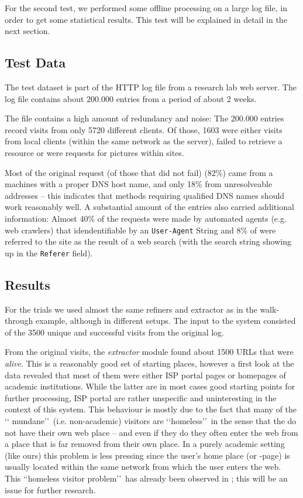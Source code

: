 \documentclass[a4paper,twoside]{danarticle}
\theoremstyle{remark}
\begin{document}
    For the second test, we performed some offline processing on a large log 
    file, in order to get some statistical results. This test will be explained 
    in detail in the next section.
    \subsection{Test Data}
      The test dataset is part of the HTTP log file from a research lab
      web server. The log file contains about 200.000 entries from a period of
      about 2 weeks.
      
      The file contains a high amount of redundancy and noise: The 200.000 
      entries record visits from only 5720 different clients. Of those, 1603 
      were either visits from local clients (within the same network as the 
      server), failed to retrieve a resource or were requests for pictures 
      within sites.
      
      Most of the original request (of those that did not fail) (82\%) came from a 
      machines with a proper
      DNS host name, and only 18\% from unresolveable addresses -- this indicates
      that methods requiring qualified DNS names should work reasonably well. A
      substantial amount of the entries also carried additional information:
      Almost 40\% of the requests were made by automated agents (e.g. web
      crawlers) that idendentifiable by an \verb$User-Agent$ String and 8\% of
      were referred to the site as the result of a web search (with the search
      string showing up in the \verb$Referer$ field). 
    \subsection{Results}
      For the trials we used almost the same refiners and extractor as in the
      walk-through example, although in different setups. The input to the 
      system consisted of the 3500 unique and successful visits from the original 
      log. 
      
      From the original visits, 
      the \textit{extractor} module found about 1500 URLs that
      were \textit{alive}. This is a reasonably good set of starting places,
      however a first look at the data revealed that most of them were either
      ISP portal pages or homepages of academic institutions. While the latter
      are in most cases good starting points for further processing, ISP portal
      are rather unspecific and uninteresting in the context of this system.
      This behaviour is mostly due to the fact that many of the \lq\lq
      mundane\rq\rq\ (i.e. non-academic) visitors are \lq\lq homeless\rq\rq\ in
      the sense that the do not have their own web place -- and even if they do
      they often enter the web from a place that is far removed from their own
      place. In a purely academic setting (like ours) this problem is less
      pressing since the user's home place (or -page) is usually located within
      the same network from which the user enters the web. This \lq\lq homeless
      visitor problem\rq\rq\ has already been observed in \cite{webaware};
      this will be an issue for further research.
      
\end{document}

